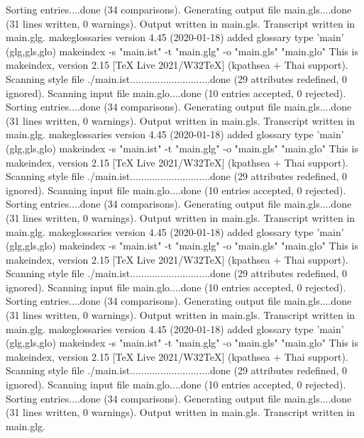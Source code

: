 Sorting entries....done (34 comparisons).
Generating output file main.gls....done (31 lines written, 0 warnings).
Output written in main.gls.
Transcript written in main.glg.
makeglossaries version 4.45 (2020-01-18)
added glossary type 'main' (glg,gls,glo)
makeindex  -s "main.ist" -t "main.glg" -o "main.gls" "main.glo"
This is makeindex, version 2.15 [TeX Live 2021/W32TeX] (kpathsea + Thai support).
Scanning style file ./main.ist.............................done (29 attributes redefined, 0 ignored).
Scanning input file main.glo....done (10 entries accepted, 0 rejected).
Sorting entries....done (34 comparisons).
Generating output file main.gls....done (31 lines written, 0 warnings).
Output written in main.gls.
Transcript written in main.glg.
makeglossaries version 4.45 (2020-01-18)
added glossary type 'main' (glg,gls,glo)
makeindex  -s "main.ist" -t "main.glg" -o "main.gls" "main.glo"
This is makeindex, version 2.15 [TeX Live 2021/W32TeX] (kpathsea + Thai support).
Scanning style file ./main.ist.............................done (29 attributes redefined, 0 ignored).
Scanning input file main.glo....done (10 entries accepted, 0 rejected).
Sorting entries....done (34 comparisons).
Generating output file main.gls....done (31 lines written, 0 warnings).
Output written in main.gls.
Transcript written in main.glg.
makeglossaries version 4.45 (2020-01-18)
added glossary type 'main' (glg,gls,glo)
makeindex  -s "main.ist" -t "main.glg" -o "main.gls" "main.glo"
This is makeindex, version 2.15 [TeX Live 2021/W32TeX] (kpathsea + Thai support).
Scanning style file ./main.ist.............................done (29 attributes redefined, 0 ignored).
Scanning input file main.glo....done (10 entries accepted, 0 rejected).
Sorting entries....done (34 comparisons).
Generating output file main.gls....done (31 lines written, 0 warnings).
Output written in main.gls.
Transcript written in main.glg.
makeglossaries version 4.45 (2020-01-18)
added glossary type 'main' (glg,gls,glo)
makeindex  -s "main.ist" -t "main.glg" -o "main.gls" "main.glo"
This is makeindex, version 2.15 [TeX Live 2021/W32TeX] (kpathsea + Thai support).
Scanning style file ./main.ist.............................done (29 attributes redefined, 0 ignored).
Scanning input file main.glo....done (10 entries accepted, 0 rejected).
Sorting entries....done (34 comparisons).
Generating output file main.gls....done (31 lines written, 0 warnings).
Output written in main.gls.
Transcript written in main.glg.
